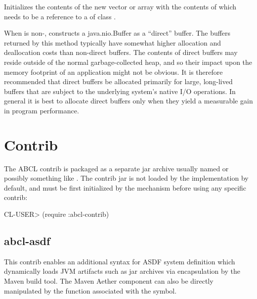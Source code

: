 \documentclass[10pt]{book}
\begin{document}
\begin{description}[style=nextline]

\item[\code{:nio-buffer NIO-BUFFER}]

Initializes the contents of the new vector or array with the contents
of  which needs to be a reference to a
 of class .

\item[\code{:nio-direct NIO-DIRECT-P}]

When  is non-, constructs a
java.nio.Buffer as a ``direct'' buffer.  The buffers returned by this
method typically have somewhat higher allocation and deallocation
costs than non-direct buffers. The contents of direct buffers may
reside outside of the normal garbage-collected heap, and so their
impact upon the memory footprint of an application might not be
obvious. It is therefore recommended that direct buffers be allocated
primarily for large, long-lived buffers that are subject to the
underlying system's native I/O operations. In general it is best to
allocate direct buffers only when they yield a measurable gain in
program performance.

\end{description}


\chapter{Contrib}

The \textsc{ABCL} contrib is packaged as a separate jar archive usually named
 or possibly something like
.  The contrib jar is not loaded by the
implementation by default, and must be first initialized by the
 mechanism before using any specific contrib:

\begin{listing-lisp}
CL-USER> (require :abcl-contrib)
\end{listing-lisp}

\section{abcl-asdf}
\label{section:abcl-asdf}

This contrib enables an additional syntax for \textsc{ASDF} system
definition which dynamically loads \textsc{JVM} artifacts such as jar
archives via encapsulation by the Maven build tool.  The Maven Aether
component can also be directly manipulated by the function associated
with the  symbol.
\end{document}
